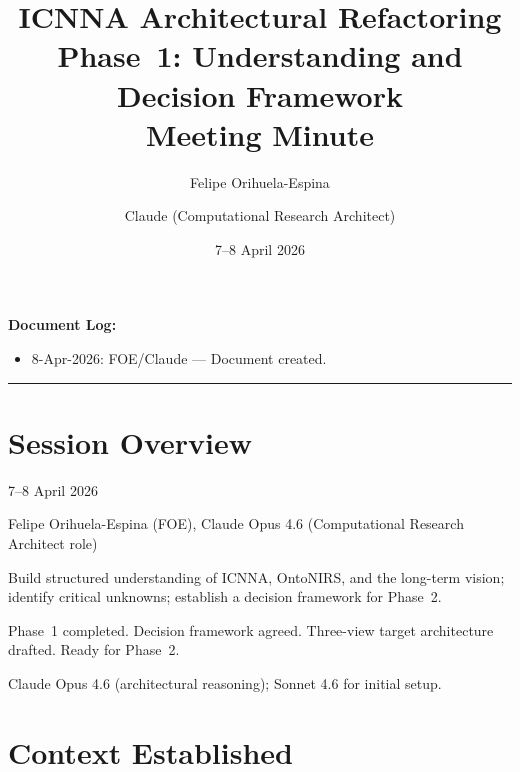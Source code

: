 \documentclass[11pt,a4paper]{article}
\title{ICNNA Architectural Refactoring\\Phase~1: Understanding and Decision Framework\\
\large Meeting Minute}
\author{Felipe Orihuela-Espina \and Claude (Computational Research Architect)}
\date{7--8 April 2026}
\begin{document}
\maketitle

\noindent\textbf{Document Log:}
\begin{itemize}[nosep]
    \item 8-Apr-2026: FOE/Claude --- Document created.
\end{itemize}

\vspace{1em}
\hrule
\vspace{1em}

\section{Session Overview}

\begin{description}[style=nextline]
    \item[Date:] 7--8 April 2026
    \item[Participants:] Felipe Orihuela-Espina (FOE), Claude Opus 4.6 (Computational Research Architect role)
    \item[Objective:] Build structured understanding of ICNNA, OntoNIRS, and the long-term vision; identify critical unknowns; establish a decision framework for Phase~2.
    \item[Outcome:] Phase~1 completed. Decision framework agreed. Three-view target architecture drafted. Ready for Phase~2.
    \item[Model used:] Claude Opus 4.6 (architectural reasoning); Sonnet 4.6 for initial setup.
\end{description}

\section{Context Established}
\end{document}

